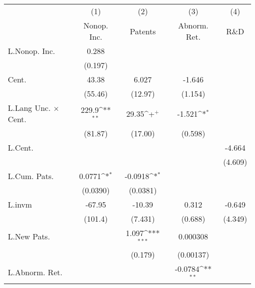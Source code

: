 {
\def\sym#1{\ifmmode^{#1}\else\(^{#1}\)\fi}
\begin{tabular}{l*{4}{c}}
\hline\hline
                    &\multicolumn{1}{c}{(1)}&\multicolumn{1}{c}{(2)}&\multicolumn{1}{c}{(3)}&\multicolumn{1}{c}{(4)}\\
                    &\multicolumn{1}{c}{Nonop. Inc.}&\multicolumn{1}{c}{Patents}&\multicolumn{1}{c}{Abnorm. Ret.}&\multicolumn{1}{c}{R\&D}\\
\hline
L.Nonop. Inc.       &       0.288         &                     &                     &                     \\
                    &     (0.197)         &                     &                     &                     \\
Cent.               &       43.38         &       6.027         &      -1.646         &                     \\
                    &     (55.46)         &     (12.97)         &     (1.154)         &                     \\
L.Lang Unc. $\times$ Cent.&       229.9\sym{**} &       29.35\sym{+}  &      -1.521\sym{*}  &                     \\
                    &     (81.87)         &     (17.00)         &     (0.598)         &                     \\
L.Cent.             &                     &                     &                     &      -4.664         \\
                    &                     &                     &                     &     (4.609)         \\
L.Cum. Pats.        &      0.0771\sym{*}  &     -0.0918\sym{*}  &                     &                     \\
                    &    (0.0390)         &    (0.0381)         &                     &                     \\
L.invm              &      -67.95         &      -10.39         &       0.312         &      -0.649         \\
                    &     (101.4)         &     (7.431)         &     (0.688)         &     (4.349)         \\
L.New Pats.         &                     &       1.097\sym{***}&    0.000308         &                     \\
                    &                     &     (0.179)         &   (0.00137)         &                     \\
L.Abnorm. Ret.      &                     &                     &     -0.0784\sym{**} &                     \\

\end{tabular}}
